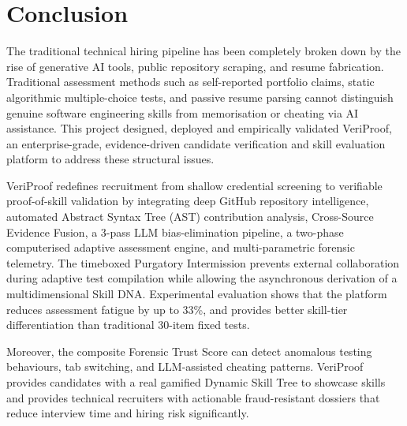 \section{Conclusion}
The traditional technical hiring pipeline has been completely broken down by the rise of generative AI tools, public repository scraping, and resume fabrication. Traditional assessment methods such as self-reported portfolio claims, static algorithmic multiple-choice tests, and passive resume parsing cannot distinguish genuine software engineering skills from memorisation or cheating via AI assistance. This project designed, deployed and empirically validated VeriProof, an enterprise-grade, evidence-driven candidate verification and skill evaluation platform to address these structural issues.

VeriProof redefines recruitment from shallow credential screening to verifiable proof-of-skill validation by integrating deep GitHub repository intelligence, automated Abstract Syntax Tree (AST) contribution analysis, Cross-Source Evidence Fusion, a 3-pass LLM bias-elimination pipeline, a two-phase computerised adaptive assessment engine, and multi-parametric forensic telemetry. The timeboxed Purgatory Intermission prevents external collaboration during adaptive test compilation while allowing the asynchronous derivation of a multidimensional Skill DNA. Experimental evaluation shows that the platform reduces assessment fatigue by up to 33\%, and provides better skill-tier differentiation than traditional 30-item fixed tests.

Moreover, the composite Forensic Trust Score can detect anomalous testing behaviours, tab switching, and LLM-assisted cheating patterns. VeriProof provides candidates with a real gamified Dynamic Skill Tree to showcase skills and provides technical recruiters with actionable fraud-resistant dossiers that reduce interview time and hiring risk significantly.

